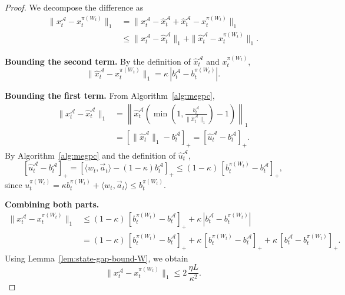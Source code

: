 \begin{proof}
We decompose the difference as
\begin{align*}
\|x_t^{\mathcal{A}} - x_t^{\pi(W_t)}\|_1
&=
\|x_t^{\mathcal{A}} - \widehat{x}_t^{\mathcal{A}} + \widehat{x}_t^{\mathcal{A}} - x_t^{\pi(W_t)}\|_1
\\&\le
\|x_t^{\mathcal{A}} - \widehat{x}_t^{\mathcal{A}}\|_1
+ \|\widehat{x}_t^{\mathcal{A}} - x_t^{\pi(W_t)}\|_1.
\end{align*}

\textbf{Bounding the second term.}
By the definition of \(\widehat{x}_t^{\mathcal{A}}\) and \(x_t^{\pi(W_t)}\),
\[
\|\widehat{x}_t^{\mathcal{A}} - x_t^{\pi(W_t)}\|_1
=
\kappa\,|b_t^{\mathcal{A}} - b_t^{\pi(W_t)}|.
\]

\textbf{Bounding the first term.}
From Algorithm~\ref{alg:megpc},
\begin{align*}
\|x_t^{\mathcal{A}} - \widehat{x}_t^{\mathcal{A}}\|_1
&=
\left\|
\widehat{x}_t^{\mathcal{A}}
\!\left(
\min\!\left(1,\frac{b_t^{\mathcal{A}}}{\|\widehat{x}_t^{\mathcal{A}}\|_1}\right)
- 1
\right)
\right\|_1
\\&=
\left[\|\widehat{x}_t^{\mathcal{A}}\|_1 - b_t^{\mathcal{A}}\right]_+
=
[\widehat{u}_t^{\mathcal{A}} - b_t^{\mathcal{A}}]_+.
\end{align*}
By Algorithm~\ref{alg:megpc} and the definition of \(\widehat{u}_t^{\mathcal{A}}\),
\[
[\widehat{u}_t^{\mathcal{A}} - b_t^{\mathcal{A}}]_+
=
[\langle w_t, \vec{a}_t \rangle - (1-\kappa)b_t^{\mathcal{A}}]_+
\le
(1-\kappa)\,[b_t^{\pi(W_t)} - b_t^{\mathcal{A}}]_+,
\]
since \(u_t^{\pi(W_t)} = \kappa b_t^{\pi(W_t)} + \langle w_t, \vec{a}_t \rangle \le b_t^{\pi(W_t)}.\)

\textbf{Combining both parts.}
\begin{align*}
\|x_t^{\mathcal{A}} - x_t^{\pi(W_t)}\|_1
&\le
(1-\kappa)\,[b_t^{\pi(W_t)} - b_t^{\mathcal{A}}]_+
+ \kappa\,|b_t^{\mathcal{A}} - b_t^{\pi(W_t)}|
\\&=
(1-\kappa)\,[b_t^{\pi(W_t)} - b_t^{\mathcal{A}}]_+
+ \kappa\,[b_t^{\pi(W_t)} - b_t^{\mathcal{A}}]_+
+ \kappa\,[b_t^{\mathcal{A}} - b_t^{\pi(W_t)}]_+.
\end{align*}
Using Lemma~\ref{lem:state-gap-bound-W},
we obtain
\[
\|x_t^{\mathcal{A}} - x_t^{\pi(W_t)}\|_1
\le
2\,\frac{\eta L}{\kappa^2}.
\]
\end{proof}






